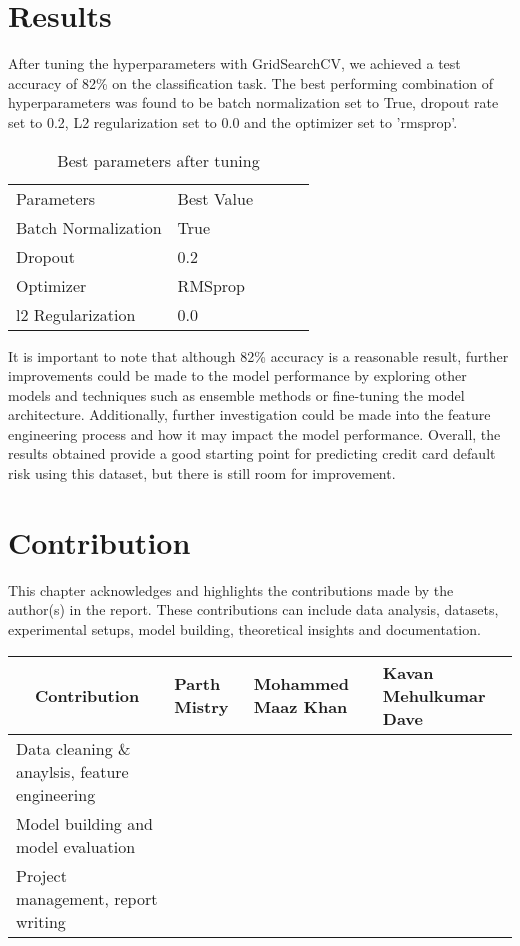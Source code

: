 \documentclass[12pt,a4paper,oneside]{article}
\begin{document}
	
	
	\section{Results}
	
	
	After tuning the hyperparameters with GridSearchCV, we achieved a test accuracy of 82\% on the classification task. The best performing combination of hyperparameters was found to be batch normalization set to True, dropout rate set to 0.2, L2 regularization set to 0.0 and the optimizer set to 'rmsprop'.
	
	\begin{table}[H]
		\centering
		\begin{tabular}{|l|l|lll}
			\cline{1-2}
			Parameters          & Best Value &  &  &  \\ \cline{1-2}
			Batch Normalization & True       &  &  &  \\
			Dropout             & 0.2        &  &  &  \\
			Optimizer           & RMSprop    &  &  &  \\
			l2 Regularization   & 0.0        &  &  &  \\ \cline{1-2}
		\end{tabular}
	\caption{Best parameters after tuning}
	\label{tab:best-param-grid}
	\end{table}
	
	It is important to note that although 82\% accuracy is a reasonable result, further improvements could be made to the model performance by exploring other models and techniques such as ensemble methods or fine-tuning the model architecture. Additionally, further investigation could be made into the feature engineering process and how it may impact the model performance. Overall, the results obtained provide a good starting point for predicting credit card default risk using this dataset, but there is still room for improvement.

	\section{Contribution}
	This chapter acknowledges and highlights the  contributions made by the author(s) in the report. These contributions can include data analysis, datasets, experimental setups, model building, theoretical insights and documentation. 
	
		
	\begin{center}
		\begin{tabular}{ |p{6cm}|p{3cm}|p{3cm}|p{3cm}|  }
			\hline
			\multicolumn{1}{|c|}{\textbf{Contribution}} & \textbf{Parth Mistry} & \textbf{Mohammed Maaz Khan} & \textbf{Kavan Mehulkumar Dave} \\ \hline
			Data cleaning \& anaylsis, feature engineering &  & \hfil \checkmark & \hfil \checkmark \\ \hline
			Model building and model evaluation & \hfil \checkmark & \hfil \checkmark  &  \\ \hline
			Project management, report writing & \hfil \checkmark &  & \hfil \checkmark \\
			\hline
		\end{tabular}
	\end{center}
	
\end{document}
